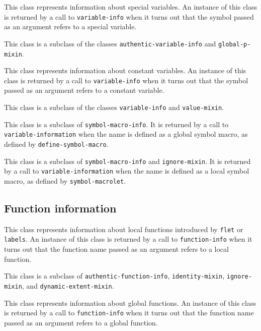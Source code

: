 
This class represents information about special variables.   An
instance of this class is returned by a call to \texttt{variable-info}
when it turns out that the symbol passed as an argument refers to a
special variable.

This class is a subclass of the classes
\texttt{authentic-variable-info} and \texttt{global-p-mixin}.


This class represents information about constant variables.   An
instance of this class is returned by a call to \texttt{variable-info}
when it turns out that the symbol passed as an argument refers to a
constant variable.

This class is a subclass of the classes \texttt{variable-info} and
\texttt{value-mixin}.


This class is a subclass of \texttt{symbol-macro-info}.  It is
returned by a call to \texttt{variable-information} when the name is
defined as a global symbol macro, as defined by
\texttt{define-symbol-macro}.


This class is a subclass of \texttt{symbol-macro-info} and
\texttt{ignore-mixin}.  It is returned by a call to
\texttt{variable-information} when the name is defined as a local
symbol macro, as defined by \texttt{symbol-macrolet}.

\subsection{Function information}


This class represents information about local functions introduced by
\texttt{flet} or \texttt{labels}.  An instance of this class is
returned by a call to \texttt{function-info} when it turns out that
the function name passed as an argument refers to a local function.

This class is a subclass of \texttt{authentic-function-info},
\texttt{identity-mixin}, \texttt{ignore-mixin}, and \texttt{dynamic-extent-mixin}.


This class represents information about global functions.  An instance
of this class is returned by a call to \texttt{function-info} when it
turns out that the function name passed as an argument refers to a
global function.

